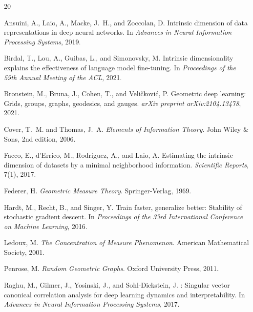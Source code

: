 \documentclass[12pt]{article}
\theoremstyle{definition}
\theoremstyle{remark}
\begin{document}

\begin{thebibliography}{20}

Ansuini, A., Laio, A., Macke, J.~H., and Zoccolan, D.
\newblock Intrinsic dimension of data representations in deep neural networks.
\newblock In \emph{Advances in Neural Information Processing Systems}, 2019.

Birdal, T., Lou, A., Guibas, L., and Simonovsky, M.
\newblock Intrinsic dimensionality explains the effectiveness of language model
  fine-tuning.
\newblock In \emph{Proceedings of the 59th Annual Meeting of the ACL}, 2021.

Bronstein, M., Bruna, J., Cohen, T., and Veli{\v{c}}kovi{\'c}, P.
\newblock Geometric deep learning: Grids, groups, graphs, geodesics, and
  gauges.
\newblock \emph{arXiv preprint arXiv:2104.13478}, 2021.

Cover, T.~M. and Thomas, J.~A.
\newblock \emph{Elements of Information Theory}.
\newblock John Wiley \& Sons, 2nd edition, 2006.

Facco, E., d'Errico, M., Rodriguez, A., and Laio, A.
\newblock Estimating the intrinsic dimension of datasets by a minimal
  neighborhood information.
\newblock \emph{Scientific Reports}, 7(1), 2017.

Federer, H.
\newblock \emph{Geometric Measure Theory}.
\newblock Springer-Verlag, 1969.

Hardt, M., Recht, B., and Singer, Y.
\newblock Train faster, generalize better: Stability of stochastic gradient
  descent.
\newblock In \emph{Proceedings of the 33rd International Conference on Machine
  Learning}, 2016.

Ledoux, M.
\newblock \emph{The Concentration of Measure Phenomenon}.
\newblock American Mathematical Society, 2001.

Penrose, M.
\newblock \emph{Random Geometric Graphs}.
\newblock Oxford University Press, 2011.

Raghu, M., Gilmer, J., Yosinski, J., and Sohl-Dickstein, J.
: Singular vector canonical correlation analysis for deep
  learning dynamics and interpretability.
\newblock In \emph{Advances in Neural Information Processing Systems}, 2017.


\end{thebibliography}
\end{document}
